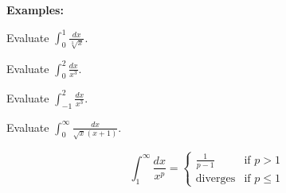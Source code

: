 \textbf{Examples:}
\begin{questions}
    \begin{minipage}{.45\linewidth}
        \question Evaluate $\displaystyle\int_0^1\frac{dx}{\sqrt[3]{x}}$.    
    \end{minipage}
    \hfill
    \begin{minipage}{.45\linewidth}
        \question Evaluate $\displaystyle\int_0^2\frac{dx}{x^3}$.
    \end{minipage}
    
    
    \newpage
    
    \question Evaluate $\displaystyle\int_{-1}^2\frac{dx}{x^3}$.
    
    
    
    
    \question Evaluate $\displaystyle\int_0^\infty\frac{dx}{\sqrt{x}(x+1)}.$
    
\end{questions}


\begin{tcolorbox}[title= A SPECIAL IMPROPER INTEGRAL,colframe=black,sharp corners,colback=white,colbacktitle=white,coltitle=black]

    \[\int_1^\infty\frac{dx}{x^p}=
    \begin{cases}
        \frac{1}{p-1} & \text{if }p>1\\
        \text{diverges} & \text{if }p\le1
    \end{cases}\]

\end{tcolorbox}


\newpage

